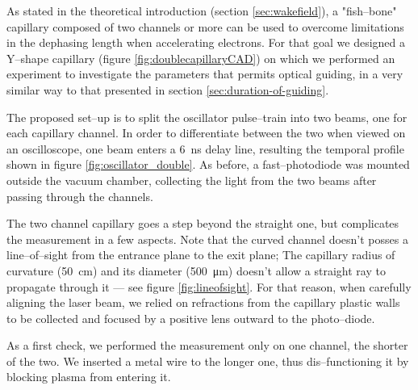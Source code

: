 \documentclass[../main.tex]{subfiles}
\begin{document}
As stated in the theoretical introduction (section \ref{sec:wakefield}), a "fish--bone" capillary composed of two channels or more can be used to overcome limitations in the dephasing length when accelerating electrons. For that goal we designed a Y--shape capillary (figure \ref{fig:doublecapillaryCAD}) on which we performed an experiment to investigate the parameters that permits optical guiding, in a very similar way to that presented in section \ref{sec:duration-of-guiding}.

The proposed set--up is to split the oscillator pulse--train into two beams, one for each capillary channel. In order to differentiate between the two when viewed on an oscilloscope, one beam enters a \SI{6}{\ns} delay line, resulting the temporal profile shown in figure \ref{fig:oscillator_double}. As before, a fast--photodiode was mounted outside the vacuum chamber, collecting the light from the two beams after passing through the channels.

The two channel capillary goes a step beyond the straight one, but complicates the measurement in a few aspects. Note that the curved channel doesn't posses a line--of--sight from the entrance plane to the exit plane; The capillary radius of curvature (\SI{50}{\cm}) and its diameter (\SI{500}{\um}) doesn't allow a straight ray to propagate through it --- see figure \ref{fig:lineofsight}. For that reason, when carefully aligning the laser beam, we relied on refractions from the capillary plastic walls to be collected and focused by a positive lens outward to the photo--diode.

As a first check, we performed the measurement only on one channel, the shorter of the two. We inserted a metal wire to the longer one, thus dis--functioning it by blocking plasma from entering it.
\end{document}
